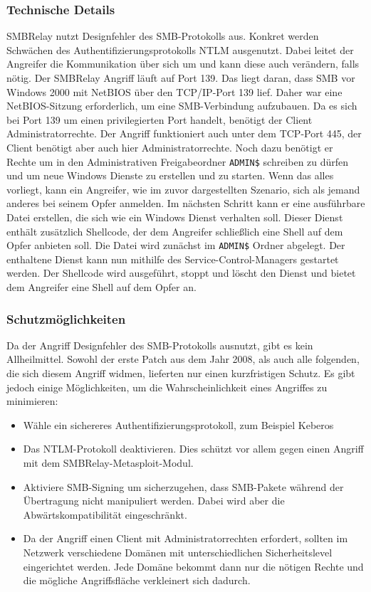 \documentclass{AIFB_ITI_Crypto_Seminar}
\begin{document}
\subsubsection{Technische Details}
SMBRelay nutzt Designfehler des SMB-Protokolls aus. Konkret werden Schwächen des Authentifizierungsprotokolls NTLM ausgenutzt. Dabei leitet der Angreifer die Kommunikation über sich um und kann diese auch verändern, falls nötig. Der SMBRelay Angriff läuft auf Port 139. Das liegt daran, dass SMB vor Windows 2000 mit NetBIOS über den TCP/IP-Port 139 lief. Daher war eine NetBIOS-Sitzung erforderlich, um eine SMB-Verbindung aufzubauen. Da es sich bei Port 139 um einen privilegierten Port handelt, benötigt der Client Administratorrechte. Der Angriff funktioniert auch unter dem TCP-Port 445, der Client benötigt aber auch hier Administratorrechte. Noch dazu benötigt er Rechte um in den  Administrativen Freigabeordner \texttt{ADMIN\$} schreiben zu dürfen und um neue Windows Dienste zu erstellen und zu starten. Wenn das alles vorliegt, kann ein Angreifer, wie im zuvor dargestellten Szenario, sich als jemand anderes bei seinem Opfer anmelden. Im nächsten Schritt kann er eine ausführbare Datei erstellen, die sich wie ein Windows Dienst verhalten soll. Dieser Dienst enthält zusätzlich Shellcode, der dem Angreifer schließlich eine Shell auf dem Opfer anbieten soll. Die Datei wird zunächst im \texttt{ADMIN\$} Ordner abgelegt. Der enthaltene Dienst kann nun mithilfe des Service-Control-Managers gestartet werden. Der Shellcode wird ausgeführt, stoppt und löscht den Dienst und bietet dem Angreifer eine Shell auf dem Opfer an.

\subsubsection{Schutzmöglichkeiten}
Da der Angriff Designfehler des SMB-Protokolls ausnutzt, gibt es kein Allheilmittel. Sowohl der erste Patch aus dem Jahr 2008, als auch alle folgenden, die sich diesem Angriff widmen, lieferten nur einen kurzfristigen Schutz. Es gibt jedoch einige Möglichkeiten, um die Wahrscheinlichkeit eines Angriffes zu minimieren:
\begin{itemize}
\item Wähle ein sichereres Authentifizierungsprotokoll, zum Beispiel Keberos 
\item Das NTLM-Protokoll deaktivieren. Dies schützt vor allem gegen einen Angriff mit dem SMBRelay-Metasploit-Modul.
\item Aktiviere SMB-Signing \cite{smbsigning} um sicherzugehen, dass SMB-Pakete während der Übertragung nicht manipuliert werden. Dabei wird aber die Abwärtskompatibilität eingeschränkt.
\item Da der Angriff einen Client mit Administratorrechten erfordert, sollten im Netzwerk verschiedene Domänen mit unterschiedlichen Sicherheitslevel eingerichtet werden. Jede Domäne bekommt dann nur die nötigen Rechte und die mögliche Angriffsfläche verkleinert sich dadurch.
\end{itemize}
\end{document}
